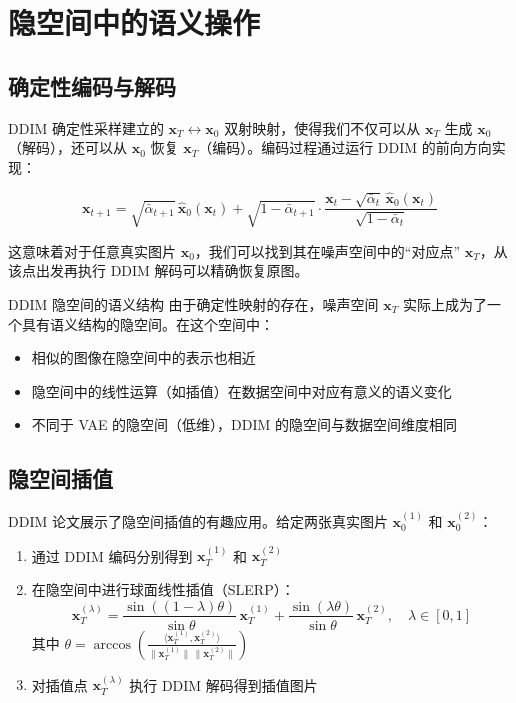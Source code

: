 \section{隐空间中的语义操作}

\subsection{确定性编码与解码}

DDIM 确定性采样建立的 $\mathbf{x}_T \leftrightarrow \mathbf{x}_0$ 双射映射，使得我们不仅可以从 $\mathbf{x}_T$ 生成 $\mathbf{x}_0$（解码），还可以从 $\mathbf{x}_0$ 恢复 $\mathbf{x}_T$（编码）。编码过程通过运行 DDIM 的前向方向实现：

$$
\mathbf{x}_{t+1} = \sqrt{\bar{\alpha}_{t+1}}\,\hat{\mathbf{x}}_0(\mathbf{x}_t) + \sqrt{1-\bar{\alpha}_{t+1}}\cdot\frac{\mathbf{x}_t - \sqrt{\bar{\alpha}_t}\,\hat{\mathbf{x}}_0(\mathbf{x}_t)}{\sqrt{1-\bar{\alpha}_t}}
$$

这意味着对于任意真实图片 $\mathbf{x}_0$，我们可以找到其在噪声空间中的``对应点'' $\mathbf{x}_T$，从该点出发再执行 DDIM 解码可以精确恢复原图。

\begin{importantbox}{DDIM 隐空间的语义结构}
由于确定性映射的存在，噪声空间 $\mathbf{x}_T$ 实际上成为了一个具有语义结构的隐空间。在这个空间中：
\begin{itemize}
    \item 相似的图像在隐空间中的表示也相近
    \item 隐空间中的线性运算（如插值）在数据空间中对应有意义的语义变化
    \item 不同于 VAE 的隐空间（低维），DDIM 的隐空间与数据空间维度相同
\end{itemize}
\end{importantbox}

\subsection{隐空间插值}

DDIM 论文展示了隐空间插值的有趣应用。给定两张真实图片 $\mathbf{x}_0^{(1)}$ 和 $\mathbf{x}_0^{(2)}$：

\begin{enumerate}
    \item 通过 DDIM 编码分别得到 $\mathbf{x}_T^{(1)}$ 和 $\mathbf{x}_T^{(2)}$
    \item 在隐空间中进行球面线性插值（SLERP）：
    $$
    \mathbf{x}_T^{(\lambda)} = \frac{\sin((1-\lambda)\theta)}{\sin\theta}\,\mathbf{x}_T^{(1)} + \frac{\sin(\lambda\theta)}{\sin\theta}\,\mathbf{x}_T^{(2)}, \quad \lambda \in [0, 1]
    $$
    其中 $\theta = \arccos\left(\frac{\langle\mathbf{x}_T^{(1)}, \mathbf{x}_T^{(2)}\rangle}{\|\mathbf{x}_T^{(1)}\|\,\|\mathbf{x}_T^{(2)}\|}\right)$
    \item 对插值点 $\mathbf{x}_T^{(\lambda)}$ 执行 DDIM 解码得到插值图片
\end{enumerate}

